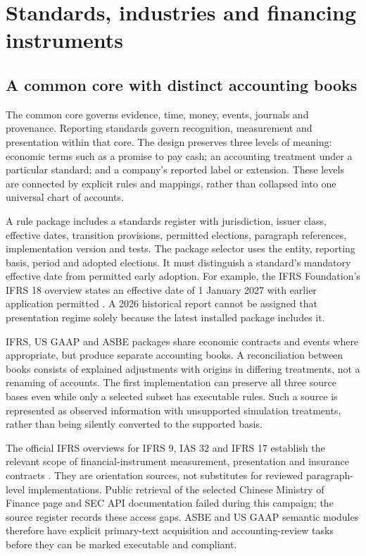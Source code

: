 \chapter{Standards, industries and financing instruments}
\label{ch:modules}

\section{A common core with distinct accounting books}

The common core governs evidence, time, money, events, journals and provenance.
Reporting standards govern recognition, measurement and presentation within
that core. The design preserves three levels of meaning: economic terms such
as a promise to pay cash; an accounting treatment under a particular standard;
and a company's reported label or extension. These levels are connected by
explicit rules and mappings, rather than collapsed into one universal chart
of accounts.

A rule package includes a standards register with jurisdiction, issuer class,
effective dates, transition provisions, permitted elections, paragraph
references, implementation version and tests. The package selector uses the
entity, reporting basis, period and adopted elections. It must distinguish a
standard's mandatory effective date from permitted early adoption. For example,
the IFRS Foundation's IFRS 18 overview states an effective date of 1 January
2027 with earlier application permitted \citep{ifrs18}. A 2026 historical
report cannot be assigned that presentation regime solely because the latest
installed package includes it.

IFRS, US GAAP and ASBE packages share economic contracts and events where
appropriate, but produce separate accounting books. A reconciliation between
books consists of explained adjustments with origins in differing treatments,
not a renaming of accounts. The first implementation can preserve all three
source bases even while only a selected subset has executable rules. Such a
source is represented as observed information with unsupported simulation
treatments, rather than being silently converted to the supported basis.

The official IFRS overviews for IFRS 9, IAS 32 and IFRS 17 establish the relevant
scope of financial-instrument measurement, presentation and insurance
contracts \citep{ifrs9,ias32,ifrs17}. They are orientation sources, not substitutes
for reviewed paragraph-level implementations. Public retrieval of the selected
Chinese Ministry of Finance page and SEC API documentation failed during this
campaign; the source register records these access gaps. ASBE and US GAAP
semantic modules therefore have explicit primary-text acquisition and
accounting-review tasks before they can be marked executable and compliant.

